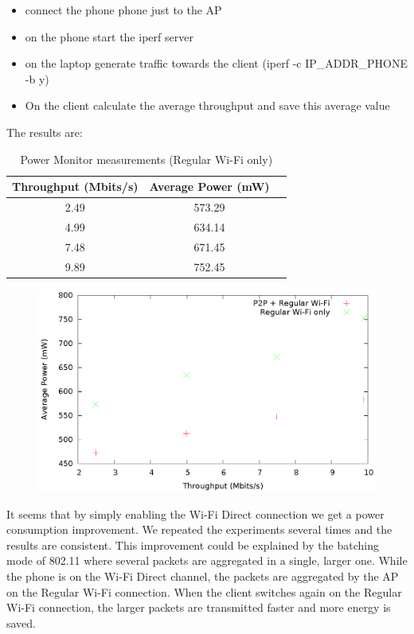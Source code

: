 \begin{itemize}
  \item connect the phone phone just to the AP
  \item on the phone start the iperf server
  \item on the laptop generate traffic towards the client (iperf -c IP_ADDR_PHONE -b y)
  \item On the client calculate the average throughput and save this average value
\end{itemize}

The results are:

\begin{table}[h!]
  \centering
  \caption{Power Monitor measurements (Regular Wi-Fi only)}
  \label{tab:table1}
  \begin{tabular}{ccc}
    \toprule
    Throughput (Mbits/s) & Average Power (mW) \\
    \midrule
    2.49 & 573.29\\
    4.99 & 634.14\\
    7.48 & 671.45\\
    9.89 & 752.45\\
    \bottomrule
  \end{tabular}
\end{table}

\begin{figure}
\includegraphics{src/img/powervalues.eps}
\end{figure}

It seems that by simply enabling the Wi-Fi Direct connection we get a power consumption improvement. We repeated the experiments several times and the results are consistent. This improvement could be explained by the batching mode of 802.11 where several packets are aggregated in a single, larger one. While the phone is on the Wi-Fi Direct channel, the packets are aggregated by the AP on the Regular Wi-Fi connection. When the client switches again on the Regular Wi-Fi connection, the larger packets are transmitted faster and more energy is saved.

